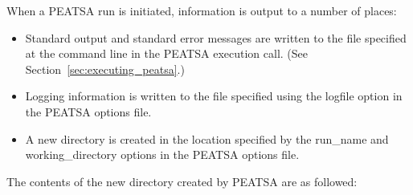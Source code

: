 
When a \ac{PEATSA} run is initiated, information is output to a number of places:

\begin{itemize}
	\item Standard output and standard error messages are written to the file specified at the command line in the \ac{PEATSA} execution call. (See Section~\ref{sec:executing_peatsa}.)
	\item Logging information is written to the file specified using the logfile option in the \ac{PEATSA} options file.
	\item A new directory is created in the location specified by the run\_name and working\_directory options in the \ac{PEATSA} options file.
\end{itemize}

\noindent The contents of the new directory created by \ac{PEATSA} are as followed:


